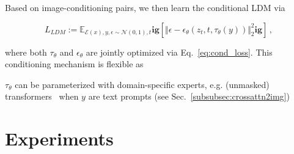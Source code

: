 Based on image-conditioning pairs, we then learn the conditional LDM via

\begin{equation}
L_{LDM} := \mathbb{E}_{\mathcal{E}(x), y, \epsilon \sim \mathcal{N}(0, 1), t }\mathbf{ig}[ \Vert \epsilon - \epsilon_\theta(z_{t},t, \tau_\theta(y)) \Vert_{2}^{2}\mathbf{ig}] \, ,
\label{eq:cond_loss}
\end{equation}

where both $\tau_\theta$ and $\epsilon_\theta$ are jointly optimized via Eq.~\ref{eq:cond_loss}.
This conditioning mechanism is flexible as 

$\tau_\theta$ can be parameterized with domain-specific experts, e.g. (unmasked) transformers~\cite{DBLP:conf/nips/VaswaniSPUJGKP17} when $y$ are text prompts (see Sec.~\ref{subsubsec:crossattn2img})

\section{Experiments}
\label{sec:experiments}

